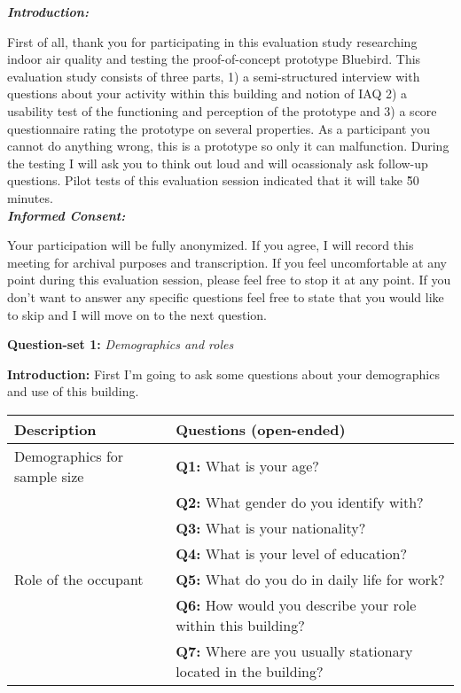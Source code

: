 \begin{appendices}
\textit{\textbf{Introduction:}}

First of all, thank you for participating in this evaluation study researching indoor air quality and testing the proof-of-concept prototype Bluebird. This evaluation study consists of three parts, 1) a semi-structured interview with questions about your activity within this building and notion of IAQ 2) a usability test of the functioning and perception of the prototype and 3) a score questionnaire rating the prototype on several properties. As a participant you cannot do anything wrong, this is a prototype so only it can malfunction. During the testing I will ask you to think out loud and will ocassionaly ask follow-up questions. Pilot tests of this evaluation session indicated that it will take \~50 minutes. \\

\textit{\textbf{Informed Consent:}}

Your participation will be fully anonymized. If you agree, I will record this meeting for archival purposes and transcription. If you feel uncomfortable at any point during this evaluation session, please feel free to stop it at any point. If you don't want to answer any specific questions feel free to state that you would like to skip and I will move on to the next question.

\begin{table}[htbp]
    \captionsetup{justification=raggedright,singlelinecheck=false}
    \raggedright \textbf{Question-set 1:} \textit{Demographics and roles} \\
    \label{tab:column_widths}
    \raggedright \textbf{Introduction:} First I'm going to ask some questions about your demographics and use of this building.
    \begin{tabularx}{\textwidth}{|p{}|X|}
        \hline
        \textbf{Description} & \textbf{Questions (open-ended)} \\
        \hline
        Demographics for sample size & \textbf{Q1:} What is your age? \\
        & \textbf{Q2:} What gender do you identify with? \\
        & \textbf{Q3:} What is your nationality? \\
        & \textbf{Q4:} What is your level of education? \\
        \hline
        Role of the occupant & 
        \textbf{Q5:} What do you do in daily life for work? \\
        & \textbf{Q6:} How would you describe your role within this building? \\
        & \textbf{Q7:} Where are you usually stationary located in the building? \\
        \hline
    \end{tabularx}
\end{table}


\end{appendices}
